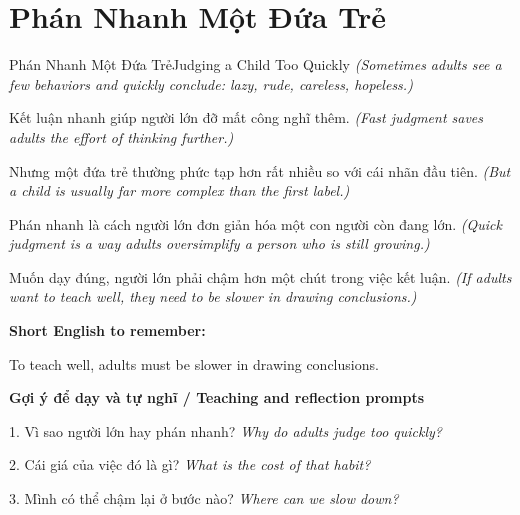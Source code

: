 \section{Phán Nhanh Một Đứa Trẻ}
\begin{truyen}{Phán Nhanh Một Đứa Trẻ}{Judging a Child Too Quickly}
\textit{(Sometimes adults see a few behaviors and quickly conclude: lazy, rude, careless, hopeless.)}

Kết luận nhanh giúp người lớn đỡ mất công nghĩ thêm.
\textit{(Fast judgment saves adults the effort of thinking further.)}

Nhưng một đứa trẻ thường phức tạp hơn rất nhiều so với cái nhãn đầu tiên.
\textit{(But a child is usually far more complex than the first label.)}

Phán nhanh là cách người lớn đơn giản hóa một con người còn đang lớn.
\textit{(Quick judgment is a way adults oversimplify a person who is still growing.)}

\end{truyen}

\begin{baihoc}
Muốn dạy đúng, người lớn phải chậm hơn một chút trong việc kết luận.
\textit{(If adults want to teach well, they need to be slower in drawing conclusions.)}
\end{baihoc}

\begin{ghinhoanh}
\textbf{Short English to remember:}

To teach well, adults must be slower in drawing conclusions.

\end{ghinhoanh}

\begin{tuhocnhanh}
\textbf{Gợi ý để dạy và tự nghĩ / Teaching and reflection prompts}

1. Vì sao người lớn hay phán nhanh? \textit{Why do adults judge too quickly?}

2. Cái giá của việc đó là gì? \textit{What is the cost of that habit?}

3. Mình có thể chậm lại ở bước nào? \textit{Where can we slow down?}
\end{tuhocnhanh}
\ngancach

